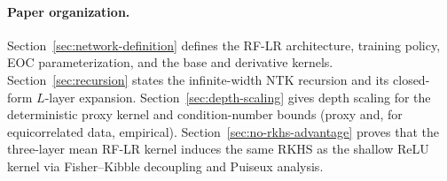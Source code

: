 \paragraph{Paper organization.}
Section~\ref{sec:network-definition} defines the RF-LR architecture, training policy, EOC parameterization, and the base and derivative kernels. Section~\ref{sec:recursion} states the infinite-width NTK recursion and its closed-form \(L\)-layer expansion. Section~\ref{sec:depth-scaling} gives depth scaling for the deterministic proxy kernel and condition-number bounds (proxy and, for equicorrelated data, empirical). Section~\ref{sec:no-rkhs-advantage} proves that the three-layer mean RF-LR kernel induces the same RKHS as the shallow ReLU kernel via Fisher--Kibble decoupling and Puiseux analysis. 
